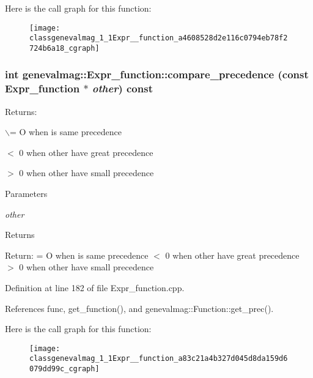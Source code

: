 Here is the call graph for this function:\nopagebreak
\begin{figure}[H]
\begin{center}
\leavevmode
\texttt{[image: classgenevalmag\_1\_1Expr\_\_function\_a4608528d2e116c0794eb78f2724b6a18\_cgraph]}
\end{center}
\end{figure}


\hypertarget{classgenevalmag_1_1Expr__function_a83c21a4b327d045d8da159d6079dd99c}{
\subsubsection[{compare\_\-precedence}]{\setlength{\rightskip}{0pt plus 5cm}int genevalmag::Expr\_\-function::compare\_\-precedence (const {\bf Expr\_\-function} $\ast$ {\em other}) const}}
\label{classgenevalmag_1_1Expr__function_a83c21a4b327d045d8da159d6079dd99c}
Returns:\par
 $\backslash$= O when is same precedence\par
 $<$ 0 when other have great precedence\par
 $>$ 0 when other have small precedence\par
 
\begin{DoxyParams}{Parameters}
\item[{\em other}]\end{DoxyParams}
\begin{DoxyReturn}{Returns}

\end{DoxyReturn}
Return: = O when is same precedence $<$ 0 when other have great precedence $>$ 0 when other have small precedence 

Definition at line 182 of file Expr\_\-function.cpp.



References func, get\_\-function(), and genevalmag::Function::get\_\-prec().



Here is the call graph for this function:\nopagebreak
\begin{figure}[H]
\begin{center}
\leavevmode
\texttt{[image: classgenevalmag\_1\_1Expr\_\_function\_a83c21a4b327d045d8da159d6079dd99c\_cgraph]}
\end{center}
\end{figure}


